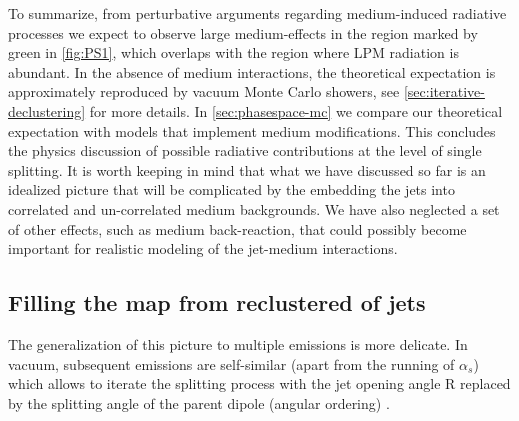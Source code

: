 To summarize, from perturbative arguments regarding medium-induced radiative processes we expect to observe large medium-effects in the region marked by green in \autoref{fig:PS1}, which overlaps with the region where LPM radiation is abundant. In the absence of medium interactions, the theoretical expectation is approximately reproduced by vacuum Monte Carlo showers, see \autoref{sec:iterative-declustering} for more details. In \autoref{sec:phasespace-mc} we compare our theoretical expectation with models that implement medium modifications. This concludes the physics discussion of possible radiative contributions at the level of single splitting. It is worth keeping in mind that what we have discussed so far is an idealized picture that will be complicated by the embedding the jets into correlated and un-correlated medium backgrounds. We have also neglected a set of other effects, such as medium back-reaction, that could possibly become important for realistic modeling of the jet-medium interactions. 


\subsection{Filling the map from reclustered of jets}
\label{sec:iterative-declustering}

The generalization of this picture to multiple emissions is more delicate. In vacuum, subsequent emissions are self-similar (apart from the running of $\alpha_s$) which allows to iterate the splitting process with the jet opening angle R replaced by the splitting angle of the parent dipole (angular ordering) \cite{Dokshitzer:1991wu}. 

